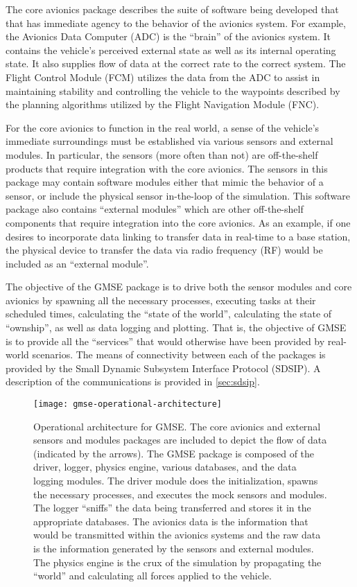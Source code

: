 The core avionics package describes the suite of software being developed that that has immediate agency to the behavior
of the avionics system. For example, the Avionics Data Computer (ADC) is the ``brain'' of the avionics system. It
contains the vehicle's perceived external state as well as its internal operating state. It also supplies flow of data
at the correct rate to the correct system. The Flight Control Module (FCM) utilizes the data from the ADC to assist in
maintaining stability and controlling the vehicle to the waypoints described by the planning algorithms utilized by the
Flight Navigation Module (FNC).

For the core avionics to function in the real world, a sense of the vehicle's immediate surroundings must be established via various sensors and external modules. In particular, the sensors (more often than not) are off-the-shelf products that require integration with the core avionics. The sensors in this package may contain software modules either that mimic the behavior of a sensor, or include the physical sensor in-the-loop of the simulation. This software package also contains ``external modules'' which are other off-the-shelf components that require integration into the core avionics. As an example, if one desires to incorporate data linking to transfer data in real-time to a base station, the physical device to transfer the data via radio frequency (RF) would be included as an ``external module''.

The objective of the GMSE package is to drive both the sensor modules and core avionics by spawning all the necessary
processes, executing tasks at their scheduled times, calculating the ``state of the world'', calculating the state of
``ownship'', as well as data logging and plotting. That is, the objective of GMSE is to provide all the ``services''
that would otherwise have been provided by real-world scenarios. The means of connectivity between each of the packages
is provided by the Small Dynamic Subsystem Interface Protocol (SDSIP). A description of the communications is provided
in \autoref{sec:sdsip}.

\begin{figure*}[ht]
  \texttt{[image: gmse-operational-architecture]}
  \caption{Operational architecture for GMSE. The core avionics and external sensors and modules packages are included
    to depict the flow of data (indicated by the arrows). The GMSE package is composed of the driver, logger, physics
    engine, various databases, and the data logging modules. The driver module does the initialization, spawns the
    necessary processes, and executes the mock sensors and modules. The logger ``sniffs'' the data being transferred and
    stores it in the appropriate databases. The avionics data is the information that would be transmitted within the
    avionics systems and the raw data is the information generated by the sensors and external modules. The physics
    engine is the crux of the simulation by propagating the ``world'' and calculating all forces applied to the
    vehicle.}
  \label{fig:gmse-operational-architecture}
\end{figure*}

